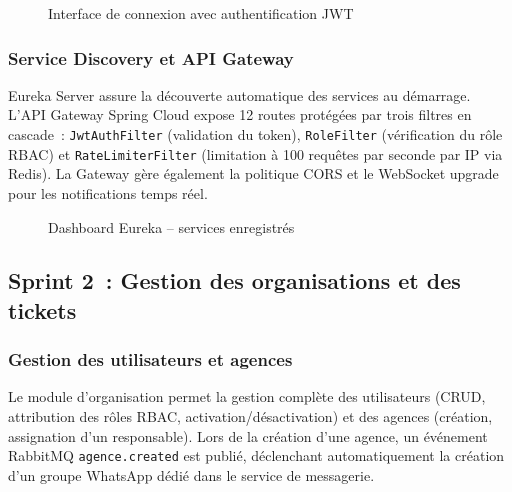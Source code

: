 \begin{figure}[H]
    \centering
    \caption{Interface de connexion avec authentification JWT}
    \label{fig:login}
\end{figure}

\subsubsection{Service Discovery et API Gateway}

Eureka Server assure la d\'{e}couverte automatique des services au d\'{e}marrage. L'API Gateway Spring Cloud expose 12 routes prot\'{e}g\'{e}es par trois filtres en cascade~: \texttt{JwtAuthFilter} (validation du token), \texttt{RoleFilter} (v\'{e}rification du r\^{o}le RBAC) et \texttt{RateLimiterFilter} (limitation \`{a} 100 requ\^{e}tes par seconde par IP via Redis). La Gateway g\`{e}re \'{e}galement la politique CORS et le WebSocket upgrade pour les notifications temps r\'{e}el.

\begin{figure}[H]
    \centering
    \caption{Dashboard Eureka -- services enregistr\'{e}s}
    \label{fig:eureka}
\end{figure}


\subsection{Sprint 2~: Gestion des organisations et des tickets}

\subsubsection{Gestion des utilisateurs et agences}

Le module d'organisation permet la gestion compl\`{e}te des utilisateurs (CRUD, attribution des r\^{o}les RBAC, activation/d\'{e}sactivation) et des agences (cr\'{e}ation, assignation d'un responsable). Lors de la cr\'{e}ation d'une agence, un \'{e}v\'{e}nement RabbitMQ \texttt{agence.created} est publi\'{e}, d\'{e}clenchant automatiquement la cr\'{e}ation d'un groupe WhatsApp d\'{e}di\'{e} dans le service de messagerie.

